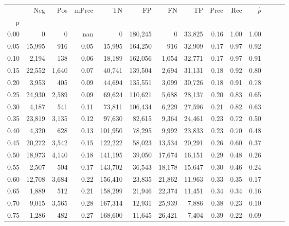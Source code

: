 \begin{tabular}{rrrrrrrrrrrrrr}
\toprule
{} &     Neg &    Pos & mPrec &       TN &       FP &      FN &      TP &  Prec &   Rec & $\hat{p}$ \\
p    &         &        &       &          &          &         &         &       &       &           \\
\midrule
0.00 &       0 &      0 &   nan &        0 &  180,245 &       0 &  33,825 &  0.16 &  1.00 &      1.00 \\
0.05 &  15,995 &    916 &  0.05 &   15,995 &  164,250 &     916 &  32,909 &  0.17 &  0.97 &      0.92 \\
0.10 &   2,194 &    138 &  0.06 &   18,189 &  162,056 &   1,054 &  32,771 &  0.17 &  0.97 &      0.91 \\
0.15 &  22,552 &  1,640 &  0.07 &   40,741 &  139,504 &   2,694 &  31,131 &  0.18 &  0.92 &      0.80 \\
0.20 &   3,953 &    405 &  0.09 &   44,694 &  135,551 &   3,099 &  30,726 &  0.18 &  0.91 &      0.78 \\
0.25 &  24,930 &  2,589 &  0.09 &   69,624 &  110,621 &   5,688 &  28,137 &  0.20 &  0.83 &      0.65 \\
0.30 &   4,187 &    541 &  0.11 &   73,811 &  106,434 &   6,229 &  27,596 &  0.21 &  0.82 &      0.63 \\
0.35 &  23,819 &  3,135 &  0.12 &   97,630 &   82,615 &   9,364 &  24,461 &  0.23 &  0.72 &      0.50 \\
0.40 &   4,320 &    628 &  0.13 &  101,950 &   78,295 &   9,992 &  23,833 &  0.23 &  0.70 &      0.48 \\
0.45 &  20,272 &  3,542 &  0.15 &  122,222 &   58,023 &  13,534 &  20,291 &  0.26 &  0.60 &      0.37 \\
0.50 &  18,973 &  4,140 &  0.18 &  141,195 &   39,050 &  17,674 &  16,151 &  0.29 &  0.48 &      0.26 \\
0.55 &   2,507 &    504 &  0.17 &  143,702 &   36,543 &  18,178 &  15,647 &  0.30 &  0.46 &      0.24 \\
0.60 &  12,708 &  3,684 &  0.22 &  156,410 &   23,835 &  21,862 &  11,963 &  0.33 &  0.35 &      0.17 \\
0.65 &   1,889 &    512 &  0.21 &  158,299 &   21,946 &  22,374 &  11,451 &  0.34 &  0.34 &      0.16 \\
0.70 &   9,015 &  3,565 &  0.28 &  167,314 &   12,931 &  25,939 &   7,886 &  0.38 &  0.23 &      0.10 \\
0.75 &   1,286 &    482 &  0.27 &  168,600 &   11,645 &  26,421 &   7,404 &  0.39 &  0.22 &      0.09 \\

\end{tabular}

